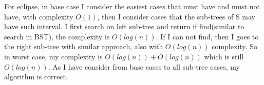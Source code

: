\documentclass[12pt]{article}
\begin{document}
For eclipse, in base case I consider the easiest cases that must have and must not have, with complexity $O{\left(1\right)}$, then I consider cases that the sub-trees of S may have such interval. I first search on left sub-tree and return if find(similar to search in BST), the complexity is $O{\left(log(n)\right)}$. If I can not find, then I goes to the right sub-tree with similar approach, also 
with $O{\left(log(n)\right)}$ complexity. So in worst case, my complexity is $O{\left(log(n)\right)} + O{\left(log(n)\right)}$ which is still $O{\left(log(n)\right)}$. As I have consider from base cases to all sub-tree cases, my algorithm is correct.
\end{document}
